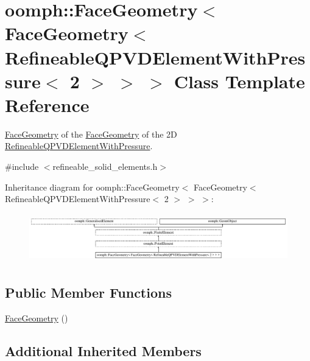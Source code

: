 \hypertarget{classoomph_1_1FaceGeometry_3_01FaceGeometry_3_01RefineableQPVDElementWithPressure_3_012_01_4_01_4_01_4}{}\section{oomph\+:\+:Face\+Geometry$<$ Face\+Geometry$<$ Refineable\+Q\+P\+V\+D\+Element\+With\+Pressure$<$ 2 $>$ $>$ $>$ Class Template Reference}
\label{classoomph_1_1FaceGeometry_3_01FaceGeometry_3_01RefineableQPVDElementWithPressure_3_012_01_4_01_4_01_4}


\hyperlink{classoomph_1_1FaceGeometry}{Face\+Geometry} of the \hyperlink{classoomph_1_1FaceGeometry}{Face\+Geometry} of the 2D \hyperlink{classoomph_1_1RefineableQPVDElementWithPressure}{Refineable\+Q\+P\+V\+D\+Element\+With\+Pressure}.  




{\ttfamily \#include $<$refineable\+\_\+solid\+\_\+elements.\+h$>$}

Inheritance diagram for oomph\+:\+:Face\+Geometry$<$ Face\+Geometry$<$ Refineable\+Q\+P\+V\+D\+Element\+With\+Pressure$<$ 2 $>$ $>$ $>$\+:\begin{figure}[H]
\begin{center}
\leavevmode
\includegraphics[height=2.141491cm]{classoomph_1_1FaceGeometry_3_01FaceGeometry_3_01RefineableQPVDElementWithPressure_3_012_01_4_01_4_01_4}
\end{center}
\end{figure}
\subsection*{Public Member Functions}
\begin{DoxyCompactItemize}
\item 
\hyperlink{classoomph_1_1FaceGeometry_3_01FaceGeometry_3_01RefineableQPVDElementWithPressure_3_012_01_4_01_4_01_4_af733346020801853c25bd0a8c4465736}{Face\+Geometry} ()
\end{DoxyCompactItemize}
\subsection*{Additional Inherited Members}



